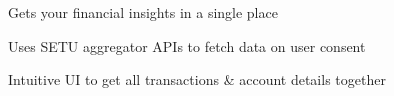 \documentclass[]{deedy-resume-openfont}
\begin{document}
\begin{minipage}[t]{0.605\textwidth}
\begin{tightemize}
\item Gets your financial insights in a single place
\item Uses SETU aggregator APIs to fetch data on user consent
\item Intuitive UI to get all transactions {\&} account details together
\end{tightemize}
\sectionsep

\end{minipage} 
\end{document}
